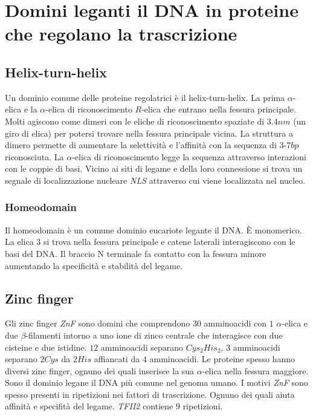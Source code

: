 \section{Domini leganti il DNA in proteine che regolano la trascrizione}
\subsection{Helix-turn-helix}
Un dominio comune delle proteine regolatrici \`e il helix-turn-helix. La prima $\alpha$-elica e la $\alpha$-elica di riconoscimento $R$-elica che entrano nella fessura principale. 
Molti agiscono come dimeri con le eliche di riconoscimento spaziate di $3.4nm$ (un giro di elica) per potersi trovare nella fessura principale vicina. La struttura a dimero permette di
aumentare la selettivit\`a e l'affinit\`a con la sequenza di $3$-$7bp$ riconosciuta. La $\alpha$-elica di riconoscimento legge la sequenza attraverso interazioni con le coppie di basi.
Vicino ai siti di legame e della loro connessione si trova un segnale di localizzazione nucleare \emph{NLS} attraverso cui viene localizzata nel nucleo.
\subsubsection{Homeodomain}
Il homeodomain \`e un comune dominio eucariote legante il DNA. \`E monomerico. La elica $3$ si trova nella fessura principale e catene laterali interagiscono con le basi del DNA. Il
braccio N terminale fa contatto con la fessura minore aumentando la specificit\`a e stabilit\`a del legame. 
\subsection{Zinc finger}
Gli zinc finger \emph{ZnF} sono domini che comprendono $30$ amminoacidi con $1$ $\alpha$-elica e due $\beta$-filamenti intorno a uno ione di zinco centrale che interagisce con due 
cisteine e due istidine. $12$ amminoacidi separano \emph{$Cys_2His_2$}, $3$ amminoacidi separano $2Cys$ da $2His$ affiancati da $4$ amminoacidi. Le proteine spesso hanno diversi 
zinc finger, ognuno dei quali inserisce la sua $\alpha$-elica nella fessura maggiore. Sono il dominio legane il DNA pi\`u comune nel genoma umano. I motivi \emph{ZnF} sono spesso 
presenti in ripetizioni nei fattori di trascrizione. Ognuno dei quali aiuta affinit\`a e specifit\`a del legame. \emph{TFII2} contiene $9$ ripetizioni. 
